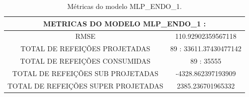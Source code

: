 \documentclass[	12pt, Times, openright, twoside, a4paper, english, brazil]{abntex2}
\begin{document}
                \begin{figure}[H]
                \end{figure}

                \begin{figure}[H]
                \end{figure}
                
                   \begin{table}[!ht]
                   \centering
                   \caption{Métricas do modelo MLP\_ENDO\_1.}
                \begin{tabular}{|c|c|}
                \hline
                \multicolumn{2}{c}{METRICAS DO MODELO MLP\_ENDO\_1 :}\\ \hline
                RMSE &  110.92902359567118\\
                TOTAL DE REFEIÇÕES PROJETADAS & 89 : 33611.37430477142\\
                TOTAL DE REFEIÇÕES CONSUMIDAS & 89 : 35555\\
                TOTAL DE REFEIÇÕES SUB PROJETADAS & -4328.862397193909\\
                TOTAL DE REFEIÇÕES SUPER PROJETADAS & 2385.236701965332\\
                \hline
                 \end{tabular} \end{table}
                 
\end{document}

